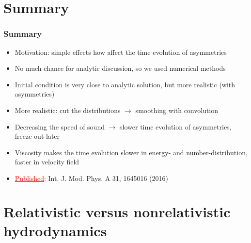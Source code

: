 \documentclass{beamer}
\begin{document}
\section{Summary}
\begin{frame}
\frametitle{Summary}
\begin{itemize}
\setlength{\itemsep}{8pt}
\item<1-> Motivation: simple effects how affect the time evolution of asymmetries
\item<1-> No much chance for analytic discussion, so we used numerical methods
\item<1-> Initial condition is very close to analytic solution, but more realistic (with asymmetries)
\item<1-> More realistic: cut the distributions $\rightarrow$ smoothing with convolution
\item<1-> Decreasing the speed of sound $\rightarrow$ slower time evolution of asymmetries, freeze-out later
\item<1-> Viscosity makes the time evolution slower in energy- and number-distribution, faster in velocity field
\item<1-> \textcolor{red}{\underline{Published}:} Int. J. Mod. Phys. A 31, 1645016 (2016)


\end{itemize}
\end{frame}




\section{Relativistic versus nonrelativistic hydrodynamics}
\end{document}
